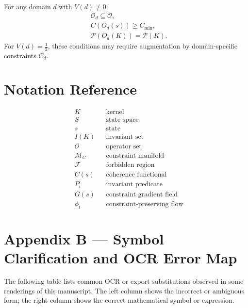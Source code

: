 \documentclass[12pt]{article}
\begin{document}
For any domain \(d\) with \(V(d) \neq 0\):
\[
\begin{aligned}
&\mathcal{O}_d \subseteq \mathcal{O}, \\
&C(O_d(s)) \ge C_{\min}, \\
&\mathcal{P}(O_d(K)) = \mathcal{P}(K).
\end{aligned}
\]
For \(V(d) = \tfrac12\), these conditions may require augmentation by domain-specific
constraints \(C_d\).

\appendix
\section{Notation Reference}

\[
\begin{aligned}
&K &&\text{kernel} \\
&S &&\text{state space} \\
&s &&\text{state} \\
&I(K) &&\text{invariant set} \\
&\mathcal{O} &&\text{operator set} \\
&\mathcal{M}_C &&\text{constraint manifold} \\
&\mathcal{F} &&\text{forbidden region} \\
&C(s) &&\text{coherence functional} \\
&P_i &&\text{invariant predicate} \\
&G(s) &&\text{constraint gradient field} \\
&\phi_t &&\text{constraint-preserving flow}
\end{aligned}
\]

\section*{Appendix B — Symbol Clarification and OCR Error Map}

The following table lists common OCR or export substitutions observed in some
renderings of this manuscript. The left column shows the incorrect or ambiguous
form; the right column shows the correct mathematical symbol or expression.
\end{document}
